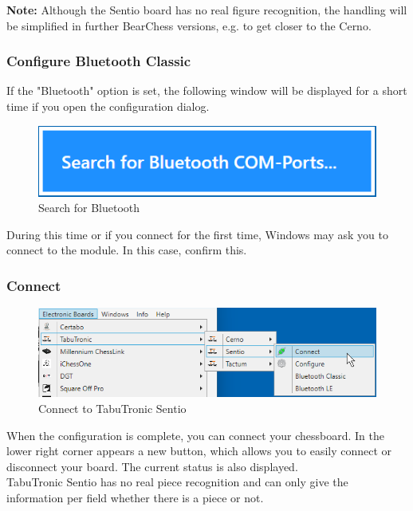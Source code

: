 \documentclass[11pt,a4paper]{article}
\begin{document}
{\color{red}\textbf{Note:}} Although the Sentio board has no real figure recognition, the handling will be simplified in further BearChess versions, e.g. to get closer to the Cerno.

\subsubsection{Configure Bluetooth Classic} \label{SentioBluetooth}

If the "Bluetooth" option is set, the following window will be displayed for a short time if you open the configuration dialog.

\begin{figure}[H]
	\centering
	\includegraphics[scale=0.8]{MillenniumChessLink10.png}
	\caption{Search for Bluetooth}
	\label{fig:SentioBT10}
\end{figure}

During this time or if you connect for the first time, Windows may ask you to connect to the module. In this case, confirm this.

\subsubsection{Connect}
\begin{figure}[H]
	\centering
	\includegraphics[scale=0.8]{Sentio3.png}
	\caption{Connect to TabuTronic Sentio}
	\label{fig:Sentio3}
\end{figure}
When the configuration is complete, you can connect your chessboard.
In the lower right corner appears a new button, which allows you to easily connect or disconnect your board. The current status is also displayed.
\\TabuTronic Sentio has no real piece recognition and can only give the information per field whether there is a piece or not.
\end{document}
